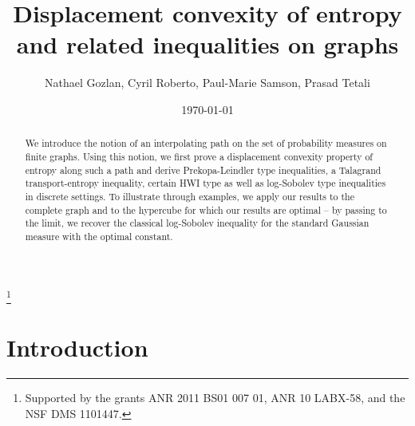 \documentclass[11pt]{amsart}
\numberwithin{equation}{section}
\begin{document}
\title[Displacement convexity  on graphs]
{Displacement convexity of entropy and related inequalities on graphs}
\author{Nathael Gozlan, Cyril Roberto, Paul-Marie Samson, Prasad Tetali}

\thanks{Supported by the grants ANR 2011 BS01 007 01,  ANR 10 LABX-58, and the NSF DMS 1101447.}

\date{\today}

\address{Universit\'e Paris Est Marne la Vall\'ee - Laboratoire d'Analyse et de Math\'e\-matiques Appliqu\'ees (UMR CNRS 8050), 5 bd Descartes, 77454 Marne la Vall\'ee Cedex 2, France}
\address{Universit\'e Paris Ouest Nanterre La D\'efense - Modal'X, 200 avenue de la R\'epublique 92000 Nanterre, France}
\address{School of Mathematics \& School of Computer Science, Georgia Institute of Technology,
Atlanta, GA 30332}

\begin{abstract}
We introduce the notion of an interpolating path on the set of probability measures on finite graphs.  Using this notion, we first prove a displacement convexity property of entropy along such a path and derive Prekopa-Leindler type inequalities, a Talagrand transport-entropy inequality, certain HWI type as well as  log-Sobolev type inequalities in discrete settings. To illustrate through examples,  we apply our results to the complete graph and to the hypercube for which our results are optimal -- by passing to the limit, we recover the classical log-Sobolev inequality for the standard Gaussian measure with the optimal constant. 
\end{abstract}

\maketitle

\section{Introduction}
\end{document}
